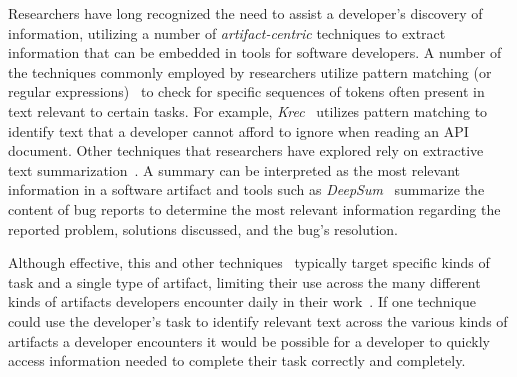 Researchers have long recognized the need to assist a developer's discovery of information,
utilizing a number of
\textit{artifact-centric} techniques
to extract
information that can be embedded in
tools for software developers. 
A number of the techniques commonly employed by researchers utilize pattern matching (or regular expressions)~\cite{Maalej2013, Bavota2014, Chaparro2017}   
to check for specific sequences of tokens often present in text relevant to certain tasks. For example, \textit{Krec}~\cite{Robillard2015} utilizes pattern matching to identify text that a developer cannot afford to ignore when reading an API document.
Other techniques that researchers have explored rely on extractive text summarization~\cite{Rastkar2010, Lotufo2012, Murray2008}. 
A summary can be interpreted as the most relevant information in a software artifact 
and tools such as \textit{DeepSum}~\cite{Li2018} summarize the content of bug reports to determine 
the most relevant information regarding the reported problem, solutions discussed, and the bug's resolution. 





Although effective, this and other techniques~\red{\cite{}} typically
target specific kinds of task and a single type of artifact, limiting their use across the
many different kinds of artifacts developers encounter
daily in their work~\red{\cite{}}.
If one technique could use the developer's task
to identify relevant text across the various kinds
of artifacts a developer encounters
it would be possible for a
developer to quickly access information needed 
to complete their task correctly and completely.



